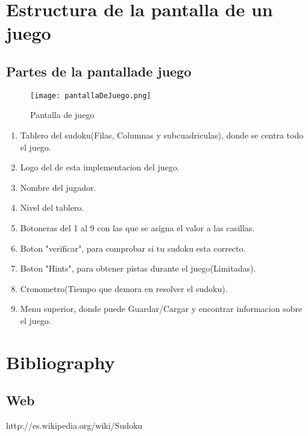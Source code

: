 \documentclass[11pt,fleqn]{book} %
\begin{document}


\chapter{Estructura de la pantalla de un juego}

\section{Partes de la pantallade juego}

\begin{figure}[H]
\centering\texttt{[image: pantallaDeJuego.png]}
\caption{Pantalla de juego}
\end{figure}

\begin{enumerate}
\item Tablero del sudoku(Filas, Columnas y subcuadriculas), donde se centra todo el juego.
\item Logo del de esta implementacion del juego.
\item Nombre del jugador.
\item Nivel del tablero.
\item Botoneras del 1 al 9 con las que se asigna el valor a las casillas.
\item Boton "verificar", para comprobar si tu sudoku esta correcto.
\item Boton "Hints", para obtener pistas durante el juego(Limitadas).
\item Cronometro(Tiempo que demora en resolver el sudoku).
\item Menu superior, donde puede Guardar/Cargar y encontrar informacion sobre el juego.

\end{enumerate}






\chapter*{Bibliography}
\section*{Web}
http://es.wikipedia.org/wiki/Sudoku
\end{document}
